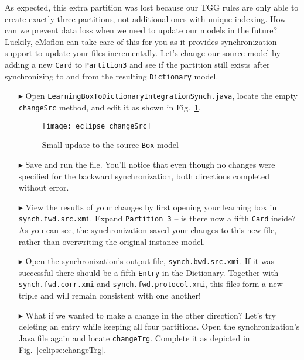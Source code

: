 As expected, this extra partition was lost because our TGG rules are only able to create exactly three partitions, not additional ones with unique indexing.
How can we prevent data loss when we need to update our models in the future? Luckily, eMoflon can take care of this for you as it provides synchronization
support to update your files incrementally. Let's change our source model by adding a new \texttt{Card} to \texttt{Partition3} and see if the partition still
exists after synchronizing to and from the resulting \texttt{Dictionary} model.

\begin{itemize}

\item[$\blacktriangleright$] Open \texttt{LearningBoxToDictionaryIntegrationSynch.java}, locate the empty \texttt{changeSrc} method, and edit it as
shown in Fig.~\ref{eclipse:changeSrc}.

\vspace{0.5cm}

\begin{figure}[htbp]
\begin{center}
  \texttt{[image: eclipse\_changeSrc]}
  \caption{Small update to the source \texttt{Box} model}
  \label{eclipse:changeSrc}
\end{center}
\end{figure}

\item[$\blacktriangleright$] Save and run the file. You'll notice that even though no changes were specified for the backward synchronization, both directions
completed without error.

\item[$\blacktriangleright$] View the results of your changes by first opening your learning box in \texttt{synch.fwd.src.xmi}. Expand \texttt{Partition 3} --
is there now a fifth \texttt{Card} inside? As you can see, the synchronization saved your changes to this new file, rather than overwriting the original
instance model.

\item[$\blacktriangleright$] Open the synchronization's output file, \texttt{synch.bwd.src.xmi}. If it was successful there should be a fifth \texttt{Entry} in
the Dictionary. Together with \texttt{synch.fwd.corr.xmi} and \texttt{synch.fwd.protocol.xmi}, this files form a new triple and will remain consistent with one
another!

\item[$\blacktriangleright$] What if we wanted to make a change in the other direction? Let's try deleting an entry while keeping all four partitions. Open
the synchronization's Java file again and locate \texttt{changeTrg}. Complete it as depicted in Fig.~\ref{eclipse:changeTrg}.


\end{itemize}
